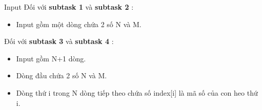Input
Đối với \textbf{ subtask 1 } và \textbf{ subtask 2 } :
\begin{itemize}
	\item Input gồm một dòng chứa 2 số N và M.
\end{itemize}

Đối với \textbf{ subtask 3 } và \textbf{ subtask 4 } :
\begin{itemize}
	\item Input gồm N+1 dòng.
	\item Dòng đầu chứa 2 số N và M.
	\item Dòng thứ i trong N dòng tiếp theo chứa số index[i] là mã số của con heo thứ i.
\end{itemize}
\begin{itemize}
\end{itemize}
